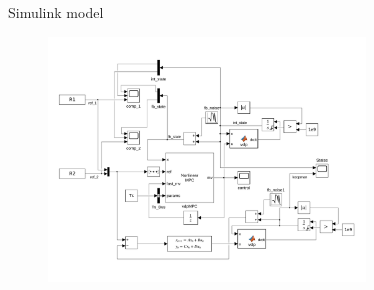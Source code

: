 \documentclass{beamer}
\begin{document}
\begin{frame}{Simulink model}
    \begin{figure}
        \centering
        \includegraphics[width=0.75\textwidth]{VDP_comparison.png}
    \end{figure}
\end{frame}
\end{document}
